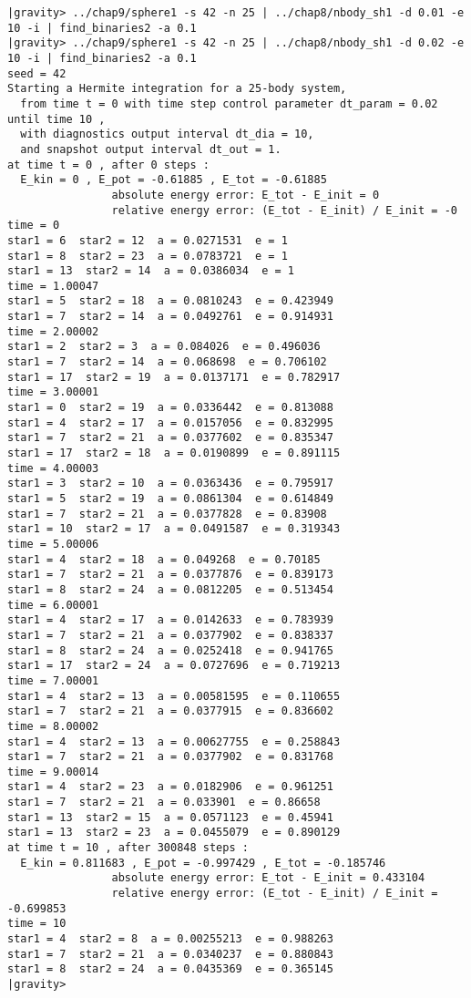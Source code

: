 \begin{small}
\begin{verbatim}
|gravity> ../chap9/sphere1 -s 42 -n 25 | ../chap8/nbody_sh1 -d 0.01 -e 10 -i | find_binaries2 -a 0.1
|gravity> ../chap9/sphere1 -s 42 -n 25 | ../chap8/nbody_sh1 -d 0.02 -e 10 -i | find_binaries2 -a 0.1
seed = 42
Starting a Hermite integration for a 25-body system,
  from time t = 0 with time step control parameter dt_param = 0.02  until time 10 ,
  with diagnostics output interval dt_dia = 10,
  and snapshot output interval dt_out = 1.
at time t = 0 , after 0 steps :
  E_kin = 0 , E_pot = -0.61885 , E_tot = -0.61885
                absolute energy error: E_tot - E_init = 0
                relative energy error: (E_tot - E_init) / E_init = -0
time = 0
star1 = 6  star2 = 12  a = 0.0271531  e = 1
star1 = 8  star2 = 23  a = 0.0783721  e = 1
star1 = 13  star2 = 14  a = 0.0386034  e = 1
time = 1.00047
star1 = 5  star2 = 18  a = 0.0810243  e = 0.423949
star1 = 7  star2 = 14  a = 0.0492761  e = 0.914931
time = 2.00002
star1 = 2  star2 = 3  a = 0.084026  e = 0.496036
star1 = 7  star2 = 14  a = 0.068698  e = 0.706102
star1 = 17  star2 = 19  a = 0.0137171  e = 0.782917
time = 3.00001
star1 = 0  star2 = 19  a = 0.0336442  e = 0.813088
star1 = 4  star2 = 17  a = 0.0157056  e = 0.832995
star1 = 7  star2 = 21  a = 0.0377602  e = 0.835347
star1 = 17  star2 = 18  a = 0.0190899  e = 0.891115
time = 4.00003
star1 = 3  star2 = 10  a = 0.0363436  e = 0.795917
star1 = 5  star2 = 19  a = 0.0861304  e = 0.614849
star1 = 7  star2 = 21  a = 0.0377828  e = 0.83908
star1 = 10  star2 = 17  a = 0.0491587  e = 0.319343
time = 5.00006
star1 = 4  star2 = 18  a = 0.049268  e = 0.70185
star1 = 7  star2 = 21  a = 0.0377876  e = 0.839173
star1 = 8  star2 = 24  a = 0.0812205  e = 0.513454
time = 6.00001
star1 = 4  star2 = 17  a = 0.0142633  e = 0.783939
star1 = 7  star2 = 21  a = 0.0377902  e = 0.838337
star1 = 8  star2 = 24  a = 0.0252418  e = 0.941765
star1 = 17  star2 = 24  a = 0.0727696  e = 0.719213
time = 7.00001
star1 = 4  star2 = 13  a = 0.00581595  e = 0.110655
star1 = 7  star2 = 21  a = 0.0377915  e = 0.836602
time = 8.00002
star1 = 4  star2 = 13  a = 0.00627755  e = 0.258843
star1 = 7  star2 = 21  a = 0.0377902  e = 0.831768
time = 9.00014
star1 = 4  star2 = 23  a = 0.0182906  e = 0.961251
star1 = 7  star2 = 21  a = 0.033901  e = 0.86658
star1 = 13  star2 = 15  a = 0.0571123  e = 0.45941
star1 = 13  star2 = 23  a = 0.0455079  e = 0.890129
at time t = 10 , after 300848 steps :
  E_kin = 0.811683 , E_pot = -0.997429 , E_tot = -0.185746
                absolute energy error: E_tot - E_init = 0.433104
                relative energy error: (E_tot - E_init) / E_init = -0.699853
time = 10
star1 = 4  star2 = 8  a = 0.00255213  e = 0.988263
star1 = 7  star2 = 21  a = 0.0340237  e = 0.880843
star1 = 8  star2 = 24  a = 0.0435369  e = 0.365145
|gravity> 
\end{verbatim}
\end{small}


